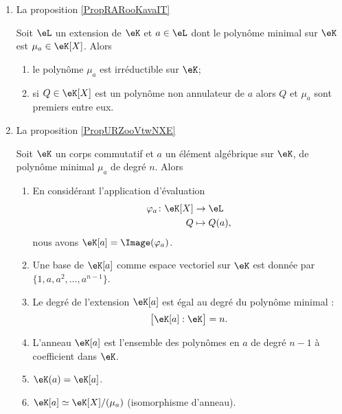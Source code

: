 \begin{enumerate}
\item   La proposition \ref{PropRARooKavaIT}

    \begin{proposition}
    Soit \( \eL\) un extension de \( \eK\) et \( a\in \eL\) dont le polynôme minimal sur \( \eK\) est \( \mu_a\in\eK[X]\). Alors
    \begin{enumerate}
        \item   
            le polynôme \( \mu_a\) est irréductible sur \( \eK\);
        \item
            si \( Q\in \eK[X]\) est un polynôme non annulateur de \( a\) alors \( Q\) et \( \mu_a\) sont premiers entre eux.
    \end{enumerate}
\end{proposition}

\item La proposition \ref{PropURZooVtwNXE}


\begin{proposition}  
    Soit \( \eK\) un corps commutatif et \( a\) un élément algébrique sur \( \eK\), de polynôme minimal \( \mu_a\) de degré \( n\). Alors
    \begin{enumerate}
        \item
            En considérant l'application d'évaluation
            \begin{equation}
                \begin{aligned}
                    \varphi_a\colon \eK[X]&\to \eL \\
                    Q&\mapsto Q(a), 
                \end{aligned}
            \end{equation}
            nous avons \( \eK[a]=\Image(\varphi_a)\).
        \item
            Une base de \( \eK[a]\) comme espace vectoriel sur \( \eK\) est donnée par \( \{ 1,a,a^2,\ldots, a^{n-1} \}\).
        \item
            Le degré de l'extension \( \eK[a]\) est égal au degré du polynôme minimal :
            \begin{equation}
                \big[ \eK[a]:\eK \big]=n.
            \end{equation}
         \item
            L'anneau \( \eK[a]\) est l'ensemble des polynômes en \( a\) de degré \( n-1\) à coefficient dans \( \eK\).
        \item
            \( \eK(a)=\eK[a]\).
        \item 
            \( \eK[a]\simeq\eK[X]/(\mu_a)\) (isomorphisme d'anneau).
    \end{enumerate}
\end{proposition}


\end{enumerate}
